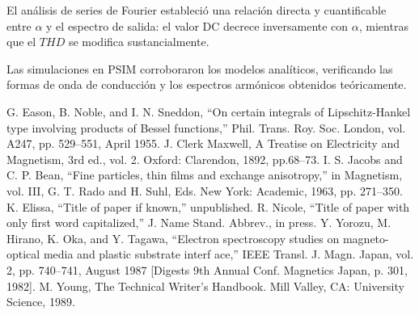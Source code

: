 \documentclass[conference]{IEEEtran}
\begin{document}
El análisis de series de Fourier estableció una relación directa y cuantificable entre $\alpha$ y el espectro de salida: el valor DC decrece inversamente con $\alpha$,
mientras que el $THD$ se modifica sustancialmente.

Las simulaciones en PSIM corroboraron los modelos analíticos, verificando las formas de onda de conducción y los espectros armónicos obtenidos teóricamente.

\begin{thebibliography}{plain}
 G. Eason, B. Noble, and I. N. Sneddon, ``On certain integrals of Lipschitz-Hankel type involving products of Bessel functions,'' Phil. Trans. Roy. Soc. London, vol. A247, pp. 529--551, April 1955.
 J. Clerk Maxwell, A Treatise on Electricity and Magnetism, 3rd ed., vol. 2. Oxford: Clarendon, 1892, pp.68--73.
 I. S. Jacobs and C. P. Bean, ``Fine particles, thin films and exchange anisotropy,'' in Magnetism, vol. III, G. T. Rado and H. Suhl, Eds. New York: Academic, 1963, pp. 271--350.
 K. Elissa, ``Title of paper if known,'' unpublished.
 R. Nicole, ``Title of paper with only first word capitalized,'' J. Name Stand. Abbrev., in press.
 Y. Yorozu, M. Hirano, K. Oka, and Y. Tagawa, ``Electron spectroscopy studies on magneto-optical media and plastic substrate interf	ace,'' IEEE Transl. J. Magn. Japan, vol. 2, pp. 740--741, August 1987 [Digests 9th Annual Conf. Magnetics Japan, p. 301, 1982].
 M. Young, The Technical Writer's Handbook. Mill Valley, CA: University Science, 1989.
\end{thebibliography}
\end{document}
